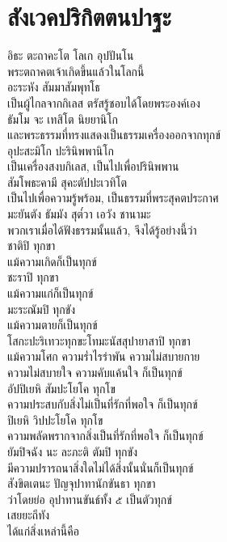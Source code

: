 \documentclass{article}
\begin{document}
\section{สังเวคปริกิตตนปาฐะ}
อิธะ ตะถาคะโต โลเก อุปปันโน\\
\indent พระตถาคตเจ้าเกิดขึ้นแล้วในโลกนี้\\
อะระหัง สัมมาสัมพุทโธ\\
\indent เป็นผู้ไกลจากกิเลส ตรัสรู้ชอบได้โดยพระองค์เอง\\
ธัมโม จะ เทสิโต นิยยานิโก\\
\indent และพระธรรมที่ทรงแสดงเป็นธรรมเครื่องออกจากทุกข์\\
อุปะสะมิโก ปะรินิพพานิโก\\
\indent เป็นเครื่องสงบกิเลส, เป็นไปเพื่อปรินิพพาน\\
สัมโพธะคามี สุคะตัปปะเวทิโต\\
\indent เป็นไปเพื่อความรู้พร้อม, เป็นธรรมที่พระสุคตประกาศ\\
มะยันตัง ธัมมัง สุต๎วา เอวัง ชานามะ\\
\indent พวกเราเมื่อได้ฟังธรรมนั้นแล้ว, จึงได้รู้อย่างนี้ว่า\\
ชาติปิ ทุกขา\\
\indent แม้ความเกิดก็เป็นทุกข์\\
ชะราปิ ทุกขา\\
\indent แม้ความแก่ก็เป็นทุกข์\\
มะระณัมปิ ทุกขัง\\
\indent แม้ความตายก็เป็นทุกข์\\
โสกะปะริเทวะทุกขะโทมะนัสสุปายาสาปิ ทุกขา\\
\indent แม้ความโศก ความร่ำไรรำพัน ความไม่สบายกาย\\
ความไม่สบายใจ ความคับแค้นใจ ก็เป็นทุกข์\\
อัปปิเยหิ สัมปะโยโค ทุกโข\\
\indent ความประสบกับสิ่งไม่เป็นที่รักที่พอใจ ก็เป็นทุกข์\\
ปิเยหิ วิปปะโยโค ทุกโข\\
\indent ความพลัดพรากจากสิ่งเป็นที่รักที่พอใจ ก็เป็นทุกข์\\
ยัมปิจฉัง นะ ละภะติ ตัมปิ ทุกขัง\\
\indent มีความปรารถนาสิ่งใดไม่ได้สิ่งนั้นนั่นก็เป็นทุกข์\\
สังขิตเตนะ ปัญจุปาทานักขันธา ทุกขา\\
\indent ว่าโดยย่อ อุปาทานขันธ์ทั้ง ๕ เป็นตัวทุกข์\\
เสยยะถีทัง\\
\indent ได้แก่สิ่งเหล่านี้คือ\\
\end{document}
